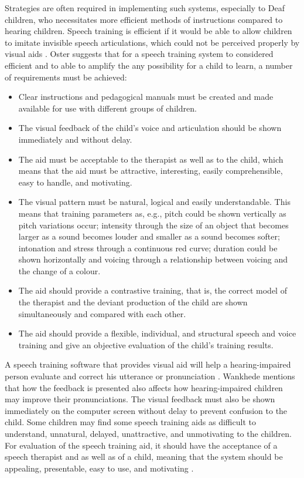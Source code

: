 Strategies are often required in implementing such systems, especially to Deaf children, who necessitates more efficient methods of instructions compared to hearing children. Speech training is efficient if it would be able to allow children to imitate invisible speech articulations, which could not be perceived properly by visual aids \cite{oster:1996:cac}. Oster \citeyear{oster:1996:cac} suggests that for a speech training system to considered efficient and to able to amplify the any possibility for a child to learn, a number of requirements must be achieved:

\begin{itemize}
\item Clear instructions and pedagogical manuals must be created and made available for use with different groups of children.
\item The visual feedback of the child’s voice and articulation should be shown immediately and without delay.
\item The aid must be acceptable to the therapist as well as to the child, which means that the aid must be attractive, interesting, easily comprehensible, easy to handle, and motivating.
\item The visual pattern must be natural, logical and easily understandable. This means that training parameters as, e.g., pitch could be shown vertically as pitch variations occur; intensity through the size of an object that becomes larger as a sound becomes louder and smaller as a sound becomes softer; intonation and stress through a continuous red curve; duration could be shown horizontally and voicing through a relationship between voicing and the change of a colour.
\item The aid should provide a contrastive training, that is, the correct model of the therapist and the deviant production of the child are shown simultaneously and compared with each other.
\item The aid should provide a flexible, individual, and structural speech and voice training and give an objective evaluation of the child’s training results.
\end{itemize}

A speech training software that provides visual aid will help a hearing-impaired person evaluate and correct his utterance or pronunciation \cite{wankhede:2014:dvs}. Wankhede mentions that how the feedback is presented also affects how hearing-impaired children may improve their pronunciations. The visual feedback must also be shown immediately on the computer screen without delay to prevent confusion to the child. Some children may find some speech training aids as difficult to understand, unnatural, delayed, unattractive, and unmotivating to the children. For evaluation of the speech training aid, it should have the acceptance of a speech therapist and as well as of a child, meaning that the system should be appealing, presentable, easy to use, and motivating \cite{wankhede:2014:dvs}.

